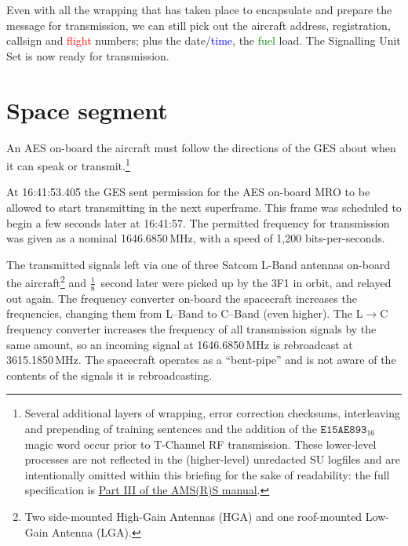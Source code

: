 \documentclass[tikz,a4paper,12pt]{article}
\begin{document}
Even with all the wrapping that has taken place to encapsulate and
prepare the message for transmission, we can still pick out the aircraft
address, registration, callsign and \textcolor{red}{flight}
numbers; plus the date/\textcolor{blue}{time}, the \textcolor{green}{fuel}
load.  The Signalling Unit Set is now ready for transmission.

\section{Space segment}

{An \acrfull{AES} on-board the aircraft must follow the directions of the
\acrfull{GES} about when it can speak or transmit.\footnote{Several additional layers of
      wrapping, error correction checksums, interleaving and
      prepending of training sentences and the addition of the
      $\mathtt{E15AE893}_{16}$ magic word occur prior to T-Channel RF
      transmission.  These lower-level processes are not reflected in
      the (higher-level) unredacted \acrlong{SU} logfiles and are
      intentionally omitted within this briefing for the sake of
      readability: the full specification is
      \href{http://www.icao.int/safety/acp/Inactive\%20working\%20groups\%20library/ACP-WG-M-Iridium-8/IRD-SWG08-WP07\%20-\%20Old_AMSS_material_Ch.4_plus_Attachment.doc}{Part
        III of the AMS(R)S manual}.}


At 16:41:53.405 the \gls{GES} sent permission for the
\gls{AES}
on-board \gls{MRO} to be allowed
to start transmitting in the next superframe.  This frame
was scheduled to begin a few seconds later at 16:41:57.  The permitted frequency
for transmission was given as a nominal 1646.6850\,MHz, with a speed of 1,200
bits-per-seconds.




The transmitted signals left via one of three Satcom L-Band antennas
on-board the aircraft\footnote{Two side-mounted High-Gain Antennas
  (HGA) and one roof-mounted Low-Gain Antenna (LGA).} and
$\frac{1}{8}$~second later were picked up by the \gls{3F1} in orbit, and relayed out again.
The frequency converter on-board the spacecraft increases the frequencies, changing them from L--Band to C--Band (even higher).  The L$\rightarrow$C frequency converter increases the frequency of all transmission signals by the same amount, so an incoming signal at
1646.6850\,MHz is rebroadcast at 3615.1850\,MHz.  The spacecraft
operates as a ``bent-pipe'' and is not aware
of the contents of the signals it is rebroadcasting.

}
\end{document}
